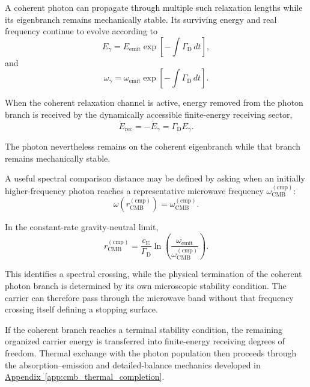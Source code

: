 A coherent photon can propagate through multiple such relaxation lengths while its eigenbranch remains mechanically stable. Its surviving energy and real frequency continue to evolve according to
\begin{equation}
    E_\gamma
    =
    E_{\mathrm{emit}}
    \exp\!\left[
        -\int
        \Gamma_{\mathrm D}\,dt
    \right],
\end{equation}
and
\begin{equation}
    \omega_\gamma
    =
    \omega_{\mathrm{emit}}
    \exp\!\left[
        -\int
        \Gamma_{\mathrm D}\,dt
    \right].
\end{equation}

When the coherent relaxation channel is active, energy removed from the photon branch is received by the dynamically accessible finite-energy receiving sector,
\begin{equation}
    \dot E_{\mathrm{rec}}
    =
    -\dot E_\gamma
    =
    \Gamma_{\mathrm D}E_\gamma.
\end{equation}

The photon nevertheless remains on the coherent eigenbranch while that branch remains mechanically stable.

A useful spectral comparison distance may be defined by asking when an initially higher-frequency photon reaches a representative microwave frequency
$\omega_{\mathrm{CMB}}^{(\mathrm{cmp})}$:
\begin{equation}
    \omega\!\left(
        r_{\mathrm{CMB}}^{(\mathrm{cmp})}
    \right)
    =
    \omega_{\mathrm{CMB}}^{(\mathrm{cmp})}.
\end{equation}

In the constant-rate gravity-neutral limit,
\begin{equation}
    r_{\mathrm{CMB}}^{(\mathrm{cmp})}
    =
    \frac{c_{\mathrm E}}
    {\Gamma_{\mathrm D}}
    \ln\!\left(
        \frac{\omega_{\mathrm{emit}}}
        {\omega_{\mathrm{CMB}}^{(\mathrm{cmp})}}
    \right).
\end{equation}

This identifies a spectral crossing, while the physical termination of the coherent photon branch is determined by its own microscopic stability condition. The carrier can therefore pass through the microwave band without that frequency crossing itself defining a stopping surface.

If the coherent branch reaches a terminal stability condition, the remaining organized carrier energy is transferred into finite-energy receiving degrees of freedom. Thermal exchange with the photon population then proceeds through the absorption--emission and detailed-balance mechanics developed in
\hyperref[app:cmb_thermal_completion]{Appendix~\ref*{app:cmb_thermal_completion}}.

